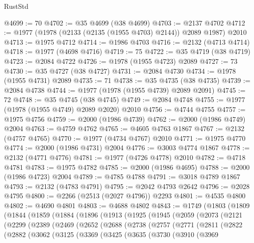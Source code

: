 \begin{lexlean}{RustStd}
\begin{coremodule}
@4699 := 70
@4702 := @35 @4699 (@38 @4699)
@4703 := @2137 @4702
@4712 := @1977 (@1978 (@2133 (@2135 (@1955 @4703) @2144)) @2089 @1987) @2010
@4713 := @1975 @4712
@4714 := @1986 @4703
@4716 := @2132 (@4713 @4714)
@4718 := @1977 (@4698 @4716)
@4719 := 75
@4722 := @35 @4719 (@38 @4719)
@4723 := @2084 @4722
@4726 := @1978 (@1955 @4723) @2089
@4727 := 73
@4730 := @35 @4727 (@38 @4727)
@4731 := @2084 @4730
@4734 := @1978 (@1955 @4731) @2089
@4735 := 71
@4738 := @35 @4735 (@38 @4735)
@4739 := @2084 @4738
@4744 := @1977 (@1978 (@1955 @4739) @2089 @2091)
@4745 := 72
@4748 := @35 @4745 (@38 @4745)
@4749 := @2084 @4748
@4755 := @1977 (@1978 (@1955 @4749) @2089 @2020) @2010
@4756 := @4744 @4755
@4757 := @1975 @4756
@4759 := @2000 (@1986 @4739)
@4762 := @2000 (@1986 @4749) @2004
@4763 := @4759 @4762
@4765 := @4605 @4763 @1867
@4767 := @2132 (@4757 @4765)
@4770 := @1977 (@4734 @4767) @2010
@4771 := @1975 @4770
@4774 := @2000 (@1986 @4731) @2004
@4776 := @3003 @4774 @1867
@4778 := @2132 (@4771 @4776)
@4781 := @1977 (@4726 @4778) @2010
@4782 := @4718 @4781
@4783 := @1975 @4782
@4785 := @2000 (@1986 @4695)
@4788 := @2000 (@1986 @4723) @2004
@4789 := @4785 @4788
@4791 := @3018 @4789 @1867
@4793 := @2132 (@4783 @4791)
@4795 := @2042 @4793 @2642
@4796 := @2028 @4795
@4800 := @2266 (@2513 (@2027 @4796)) @2293
@4801 := @4535 @4800
@4802 := @4690 @4801
@4803 := @4688 @4802
@4843 := @1749
    (@1803
      (@1809
        (@1844
          (@1859
            (@1884
              (@1896
                (@1913
                  (@1925
                    (@1945
                      (@2059
                        (@2073
                          (@2121
                            (@2299
                              (@2389
                                (@2469
                                  (@2652
                                    (@2688
                                      (@2738
                                        (@2757
                                          (@2771
                                            (@2811
                                              (@2822
                                                (@2882
                                                  (@3062
                                                    (@3125
                                                      (@3369
                                                        (@3425
                                                          (@3635
                                                            (@3730
                                                              (@3910
                                                                (@3969

\end{coremodule}
\end{lexlean}
